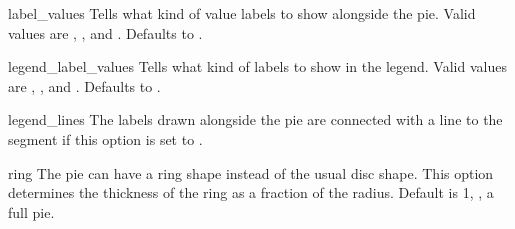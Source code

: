 \constructorblurb{\thisname}

\begin{AttrDecl}{label\_values}
Tells \thisclass what kind of value labels to show alongside the pie.
Valid values are , ,  and
. Defaults to .
\end{AttrDecl}

\begin{AttrDecl}{legend\_label\_values}
Tells \thisclass what kind of labels to show in the legend. Valid values
are , ,  and
. Defaults to .
\end{AttrDecl}

\begin{AttrDecl}{legend\_lines}
The labels drawn alongside the pie are connected with a line to the
segment if this option is set to .
\end{AttrDecl}

\begin{AttrDecl}{ring}
The pie can have a ring shape instead of the usual disc shape. This
option determines the thickness of the ring as a fraction of the radius.
Default is 1, \ie, a full pie.
\end{AttrDecl}
